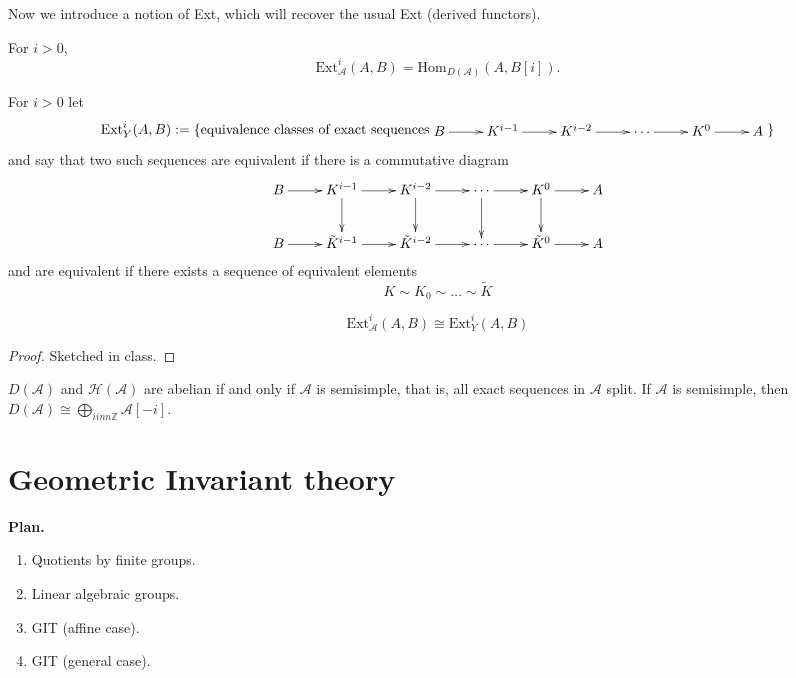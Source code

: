 Now we introduce a notion of Ext, which will recover the usual Ext (derived
functors).

\begin{definition}
\label{definition-Ext}
For $i>0$,
$$
\text{Ext}^i_{\mathcal{A}}(A,B)=\text{Hom}_{D(\mathcal{A})}(A,B[i]).
$$
\end{definition}

\begin{definition}[Yoneda]
\label{definition-Yoneda}
For $i>0$ let
$$
\text{Ext}_Y^i(A,B):=\{\text{equivalence classes of exact sequences}
\begin{aligned}
\xymatrix{
B\ar[r]&  K^{i-1}\ar[r]&  K^{i-2}\ar[r]& \cdots\ar[r]&K^0\ar[r]&A
}
\end{aligned}
\}
$$
and say that two such sequences are equivalent if there is a commutative diagram
$$
\xymatrix{
B\ar[r]&  K^{i-1}\ar[r]\ar[d]&  K^{i-2}\ar[r]\ar[d]& \cdots\ar[r]\ar[d]
&K^0\ar[r]\ar[d]&A\\
B\ar[r]&  \tilde{K}^{i-1}\ar[r]&  \tilde{K}^{i-2}\ar[r]& \cdots\ar[r]
&\tilde{K}^0\ar[r]&A
}
$$
and are equivalent if there exists a sequence of equivalent elements
$$
K \sim K_0 \sim \ldots \sim \tilde{K}
$$
\end{definition}

\begin{proposition}
\label{proposition-Ext}
$$
\text{Ext}_{\mathcal{A}}^i(A,B) \cong \text{Ext}_Y^i(A,B)
$$
\end{proposition}

\begin{proof}
Sketched in class.
\end{proof}

\begin{exercise}
\label{exercise-derived-and-homotopy-categories-abelian-characterization}
$D(\mathcal{A})$ and  $\mathcal{H}(\mathcal{A})$ are abelian if and only if
$\mathcal{A}$ is semisimple, that is, all exact sequences in $\mathcal{A}$
split. If $\mathcal{A}$ is semisimple, then $D(\mathcal{A})\cong \bigoplus_{i
inn \mathbb{Z}}\mathcal{A}[-i]$.
\end{exercise}



\section{Geometric Invariant theory}
\label{section-GIT}

{\bf Plan.} 
\begin{enumerate}
\item Quotients by finite groups.
\item Linear algebraic groups.
\item GIT (affine case).
\item GIT (general case).
\end{enumerate}

